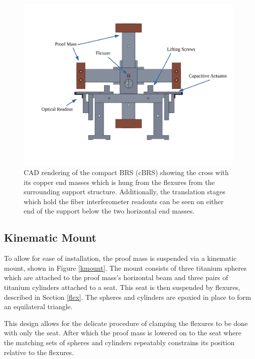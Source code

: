 \documentclass [12pt, proquest]{uwthesis}[2019]
\begin{document}
\begin{figure}[!h]
\begin{center}
 \includegraphics[width=\textwidth]{cBRSFrontLabeled.pdf}
 
\caption[Side view of the CAD rendering of the cBRS]{CAD rendering of the compact BRS (cBRS) showing the cross with its copper end masses which is hung from the flexures from the surrounding support structure. Additionally, the translation stages which hold the fiber interferometer readouts can be seen on either end of the support below the two horizontal end masses.}
\label{cBRS2}
\end{center}
\end{figure}

\subsection{Kinematic Mount}

To allow for ease of installation, the proof mass is suspended via a kinematic mount, shown in Figure \ref{kmount}. The mount consists of three titanium spheres which are attached to the proof mass's horizontal beam and three pairs of titanium cylinders attached to a seat. This seat is then suspended by flexures, described in Section \ref{flex}. The spheres and cylinders are epoxied in place to form an equilateral triangle.

This design allows for the delicate procedure of clamping the flexures to be done with only the seat. After which the proof mass is lowered on to the seat where the matching sets of spheres and cylinders repeatably constrains its position relative to the flexures.
\end{document}
